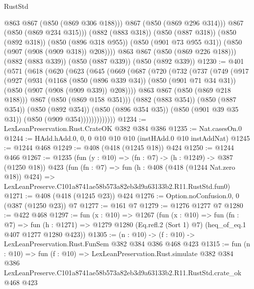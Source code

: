\begin{lexlean}{RustStd}
\begin{coremodule}
                @863
                @867
                (@850 (@869 @306 @188)))
              @867
              (@850 (@869 @296 @314)))
            @867
            (@850 (@869 @234 @315)))
          (@882 (@883 @318))
          (@850 (@887 @318))
          (@850 (@892 @318))
          (@850 (@896 @318 @955))
          (@850 (@901 @73 @955 @31))
          (@850 (@907 (@908 (@909 @318)) @208))))
      @863
      @867
      (@850 (@869 @226 @188)))
    (@882 (@883 @339))
    (@850 (@887 @339))
    (@850 (@892 @339))
@1230 := @401
    (@571
      (@618
        (@620
          (@623
            (@645
              (@669
                (@687
                  (@720
                    (@732
                      (@737
                        (@749
                          (@917
                            (@927
                              (@931
                                (@1168
                                  (@850 (@896 @339 @34))
                                  (@850 (@901 @71 @34 @31))
                                  (@850 (@907 (@908 (@909 @339)) @208))))
                              @863
                              @867
                              (@850 (@869 @218 @188)))
                            @867
                            (@850 (@869 @158 @351)))
                          (@882 (@883 @354))
                          (@850 (@887 @354))
                          (@850 (@892 @354))
                          (@850 (@896 @354 @35))
                          (@850 (@901 @39 @35 @31))
                          (@850 (@909 @354)))))))))))))
@1234 := LexLeanPreservation.Rust.CrateOK @382 @384 @386
@1235 := Nat.casesOn.{0}
@1244 := HAdd.hAdd.{0, 0, 0} @10 @10 @10 (instHAdd.{0} @10 instAddNat)
@1245 := @1244 @468
@1249 := @408 (@418 (@1245 @18)) @424
@1250 := @1244 @466
@1267 := @1235
    (fun (y : @10) => (fn : @7) -> (h : @1249) -> @387 (@1250 @18))
    @423
    (fun (fn : @7) =>
    fun (h : @408 (@418 (@1244 Nat.zero @18)) @424) =>
    LexLeanPreserve.C101a8741ae58b573a82eb3d9a63133b2.R11.RustStd.fun0)
@1271 := @408 (@418 (@1245 @23)) @424
@1276 := Option.noConfusion.{0, 0} (@387 (@1250 @23)) @7
@1277 := @161 @7
@1279 := @1276 @1277 @7
@1280 := @422 @468
@1297 := fun (x : @10) =>
  @1267
    (fun (x : @10) =>
    fun (fn : @7) =>
    fun (h : @1271) => @1279 @1280 (Eq.refl.{2} (Sort 1) @7) (heq_of_eq.{1} @407 @1277 @1280 @423))
@1305 := (n : @10) -> (f : @10) -> LexLeanPreservation.Rust.FunSem @382 @384 @386 @468 @423
@1315 := fun (n : @10) =>
  fun (f : @10) =>
  LexLeanPreservation.Rust.simulate
    @382
    @384
    @386
    LexLeanPreserve.C101a8741ae58b573a82eb3d9a63133b2.R11.RustStd.crate_ok
    @468
    @423
\end{coremodule}
\end{lexlean}
